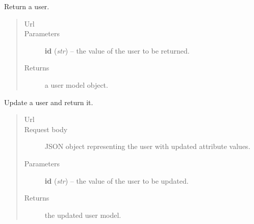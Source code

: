 \documentclass[letterpaper,10pt,english]{sphinxmanual}
\begin{document}
\begin{fulllineitems}

\begin{fulllineitems}
\label{api:onlinelinguisticdatabase.controllers.users.UsersController.show}
Return a user.
\begin{quote}\begin{description}
\item[{Url }] \leavevmode
{}

\item[{Parameters}] \leavevmode
\textbf{id} (\emph{str}) -- the  value of the user to be returned.

\item[{Returns}] \leavevmode
a user model object.

\end{description}\end{quote}

\end{fulllineitems}


\begin{fulllineitems}
\label{api:onlinelinguisticdatabase.controllers.users.UsersController.update}
Update a user and return it.
\begin{quote}\begin{description}
\item[{Url }] \leavevmode
{}

\item[{Request body}] \leavevmode
JSON object representing the user with updated attribute values.

\item[{Parameters}] \leavevmode
\textbf{id} (\emph{str}) -- the  value of the user to be updated.

\item[{Returns}] \leavevmode
the updated user model.

\end{description}\end{quote}

\end{fulllineitems}


\end{fulllineitems}
\end{document}
